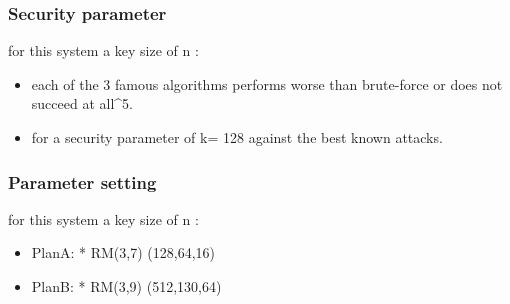 \documentclass{beamer}
\begin{document}
\begin{frame}
	\frametitle{Security parameter}
	for this system a key size of n :\\
	\vspace{0,5cm}
	\begin{itemize}
		\item each of the 3 famous algorithms performs worse than brute-force or does not succeed at all^{5}.\\ 
	\end{itemize}
	\begin{itemize}
		\item for a security parameter of k= 128 against the best known attacks.\\
	\end{itemize}
\end{frame}	

\begin{frame}
	\frametitle{Parameter setting}
	for this system a key size of n :\\
	\vspace{0,5cm}
	\begin{itemize}
		\item Plan\quad A:  * RM(3,7) \qquad (128,64,16)\\ 
	\end{itemize}
	\begin{itemize}
		\item Plan\quad B:  * RM(3,9) \qquad (512,130,64)\\
	\end{itemize}
\end{frame}	



\begin{contactframe}
    \contactpage
\end{contactframe}
\end{document}
